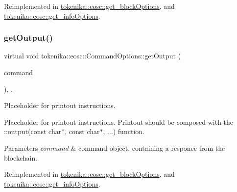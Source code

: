 Reimplemented in \hyperlink{classtokenika_1_1eosc_1_1get__block_options_a4945270fc48d5b3cc39b1af998a39dfc}{tokenika\+::eosc\+::get\+\_\+block\+Options}, and \hyperlink{classtokenika_1_1eosc_1_1get__info_options_aafb814a03f00d5700e3fa66f17be43d2}{tokenika\+::eosc\+::get\+\_\+info\+Options}.

\mbox{\label{classtokenika_1_1eosc_1_1_command_options_a346dcfb00b8ac522169714544bfa7be0}} 
\subsubsection{\texorpdfstring{get\+Output()}{getOutput()}}
{\footnotesize\ttfamily virtual void tokenika\+::eosc\+::\+Command\+Options\+::get\+Output (\begin{DoxyParamCaption}\item[{\hyperlink{classtokenika_1_1eosc_1_1_eosc_command}{Eosc\+Command}}]{command }\end{DoxyParamCaption})\hspace{0.3cm}{\ttfamily [inline]}, {\ttfamily [protected]}, {\ttfamily [virtual]}}



Placeholder for printout instructions. 

Placeholder for printout instructions. Printout should be composed with the \+::output(const char$\ast$, const char$\ast$, ...) function.


\begin{DoxyParams}{Parameters}
{\em command} & command object, containing a responce from the blockchain. \\
\hline
\end{DoxyParams}


Reimplemented in \hyperlink{classtokenika_1_1eosc_1_1get__block_options_a58257ff6c0a7413dd1c8141ffe789d91}{tokenika\+::eosc\+::get\+\_\+block\+Options}, and \hyperlink{classtokenika_1_1eosc_1_1get__info_options_aedbefe0b0c3a7efca9429066588492db}{tokenika\+::eosc\+::get\+\_\+info\+Options}.

\mbox{\label{classtokenika_1_1eosc_1_1_command_options_aa55960f380250eb7065cb6489b67196f}} 
